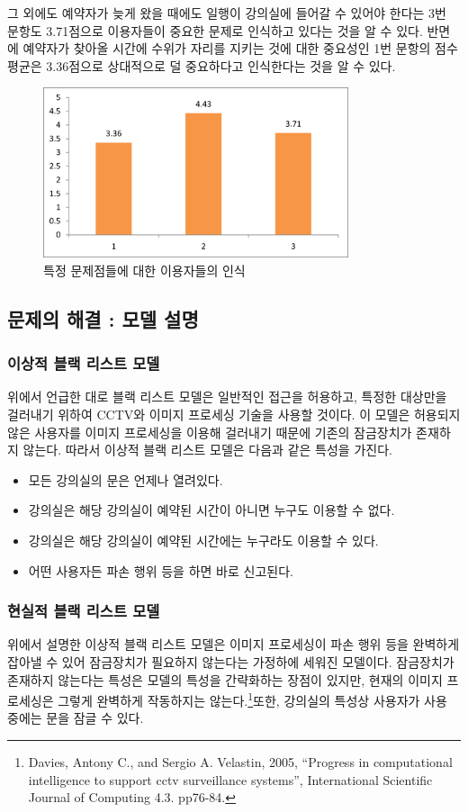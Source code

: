 \documentclass[11pt,a4paper]{article}
\begin{document}
그 외에도 예약자가 늦게 왔을 때에도 일행이 강의실에 들어갈 수 있어야 한다는 3번
문항도 3.71점으로 이용자들이 중요한 문제로 인식하고 있다는 것을 알 수 있다.
반면에 예약자가 찾아올 시간에 수위가 자리를 지키는 것에 대한 중요성인 1번
문항의 점수 평균은 3.36점으로 상대적으로 덜 중요하다고 인식한다는 것을 알 수
있다.
\begin{figure}[H]
\includegraphics[width=0.8\textwidth]{4_1_4}
\centering
\caption{특정 문제점들에 대한 이용자들의 인식}
\end{figure}


\subsection{문제의 해결 : 모델 설명}

\subsubsection{이상적 블랙 리스트 모델}
위에서 언급한 대로 블랙 리스트 모델은 일반적인 접근을 허용하고, 특정한 대상만을
걸러내기 위하여 CCTV와 이미지 프로세싱 기술을 사용할 것이다. 이 모델은 허용되지
않은 사용자를 이미지 프로세싱을 이용해 걸러내기 때문에 기존의 잠금장치가
존재하지 않는다. 따라서 이상적 블랙 리스트 모델은 다음과 같은 특성을 가진다.

\begin{itemize}
\item 모든 강의실의 문은 언제나 열려있다.
\item 강의실은 해당 강의실이 예약된 시간이 아니면 누구도 이용할 수 없다.
\item 강의실은 해당 강의실이 예약된 시간에는 누구라도 이용할 수 있다.
\item 어떤 사용자든 파손 행위 등을 하면 바로 신고된다.
\end{itemize}

\subsubsection{현실적 블랙 리스트 모델}
위에서 설명한 이상적 블랙 리스트 모델은 이미지 프로세싱이 파손 행위 등을 완벽하게
잡아낼 수 있어 잠금장치가 필요하지 않는다는 가정하에 세워진 모델이다.
잠금장치가 존재하지 않는다는 특성은 모델의 특성을 간략화하는 장점이 있지만,
현재의 이미지 프로세싱은 그렇게 완벽하게 작동하지는 않는다.\footnote{
 Davies, Antony C., and Sergio A. Velastin, 2005, ``Progress in computational
 intelligence to support cctv surveillance systems'', International Scientific
 Journal of Computing 4.3. pp76-84.
}또한, 강의실의
특성상 사용자가 사용 중에는 문을 잠글 수 있다.
\end{document}
